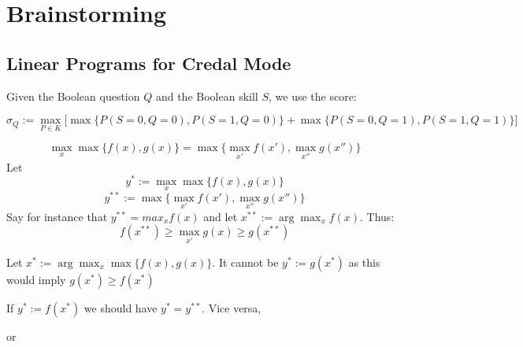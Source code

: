 \documentclass[runningheads]{llncs}
\begin{document}
	\section{Brainstorming}
	
	\subsection{Linear Programs for Credal Mode}
	
	Given the Boolean question $Q$ and the Boolean skill $S$, we use the score:
	
	\begin{equation}
		\sigma_Q := \max_{P\in K} \bigl[ 
		\max \{ P(S=0,Q=0) , P(S=1,Q=0) \}  + \max \{ P(S=0,Q=1),P(S=1,Q=1)\}
		\bigr]
	\end{equation}
	
	\begin{theorem}
		\begin{equation}
			\max_{x}  \max \{ f(x) , g(x) \}  
			=
			\max \{ \max_{x'} f(x') , \max_{x''} g(x'') \} 
		\end{equation}
		Let 
		$$y^{*}:=\max_x \max\{f(x),g(x)\}$$
		$$y^{**}:= \max \{ \max_{x'} f(x') , \max_{x''} g(x'') \}$$
		Say for instance that $y^{**}=max_x f(x)$ and let $x^{**}:=\arg\max_x f(x)$. Thus:
		$$f(x^{**})\geq \max_{x'} g(x) \geq g(x^{**})$$ 
		
		Let $x^{*}:= \arg\max_x \max\{f(x),g(x)\}$. 
		It cannot be $y^{*}:=g(x^{*})$ as this would imply $g(x^{*}) \geq f(x^{*})$ 
		
		
		
		
		If $y^{*}:=f(x^{*})$ we should have $y^{*}=y^{**}$.
		Vice versa, 
		
		or
	\end{theorem}
	
	
	
\end{document}
